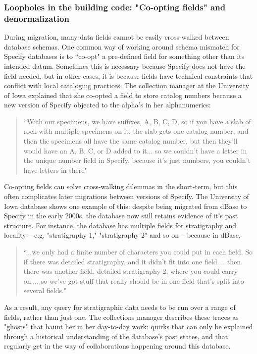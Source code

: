 \subsubsection{Loopholes in the building code: "Co-opting fields" and denormalization }

During migration, many data fields cannot be easily cross-walked between database schemas. One common way of working around schema mismatch for Specify databases is to “co-opt" a pre-defined field for something other than its intended datum. Sometimes this is necessary because Specify does not have the field needed, but in other cases, it is because fields have technical constraints that conflict with local cataloging practices. The collection manager at the University of Iowa explained that she co-opted a field to store catalog numbers because a new version of Specify objected to the alpha’s in her alphanumerics:
\begin{quote}
“With our specimens, we have suffixes, A, B, C, D, so if you have a slab of rock with multiple specimens on it, the slab gets one catalog number, and then the specimens all have the same catalog number, but then they'll would have an A, B, C, or D added to it... so we couldn't have a letter in the unique number field in Specify, because it's just numbers, you couldn't have letters in there"
\end{quote}

Co-opting fields can solve cross-walking dilemmas in the short-term, but this often complicates later migrations between versions of Specify. The University of Iowa database shows one example of this: despite being migrated from dBase to Specify in the early 2000s, the database now still retains evidence of it's past structure. For instance, the database has multiple fields for stratigraphy and locality -- e.g. "stratigraphy 1," "stratigraphy 2" and so on -- because in dBase,\begin{quote} “...we only had a finite number of characters you could put in each field. So if there was detailed stratigraphy, and it didn't fit into one field.... then there was another field, detailed stratigraphy 2, where you could carry on.... so we've got stuff that really should be in one field that's split into several fields."\end{quote}
As a result, any query for stratigraphic data needs to be run over a range of fields, rather than just one. The collections manager describes these traces as "ghosts" that haunt her in her day-to-day work: quirks that can only be explained through a historical understanding of the database's past states, and that regularly get in the way of collaborations happening around this database.

